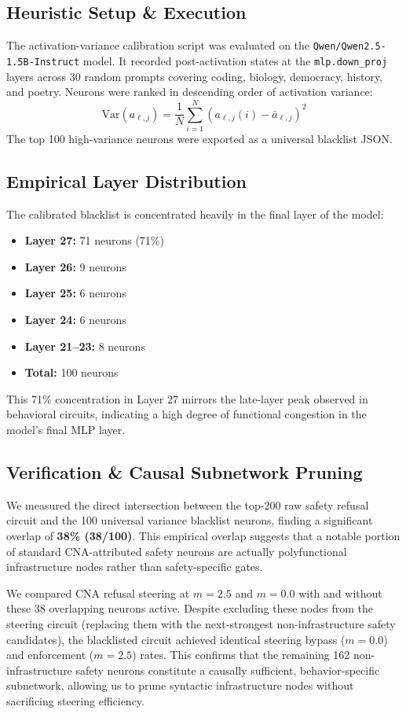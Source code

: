 \documentclass[11pt]{article}
\begin{document}
\subsection{Heuristic Setup \& Execution}
The activation-variance calibration script was evaluated on the \texttt{Qwen/Qwen2.5-1.5B-Instruct} model. It recorded post-activation states at the \texttt{mlp.down\_proj} layers across 30 random prompts covering coding, biology, democracy, history, and poetry. Neurons were ranked in descending order of activation variance:
\begin{equation}
\text{Var}(a_{\ell,j}) = \frac{1}{N}\sum_{i=1}^N (a_{\ell,j}(i) - \bar{a}_{\ell,j})^2
\end{equation}
The top 100 high-variance neurons were exported as a universal blacklist JSON.

\subsection{Empirical Layer Distribution}
The calibrated blacklist is concentrated heavily in the final layer of the model:
\begin{itemize}
    \item \textbf{Layer 27:} 71 neurons (71\%)
    \item \textbf{Layer 26:} 9 neurons
    \item \textbf{Layer 25:} 6 neurons
    \item \textbf{Layer 24:} 6 neurons
    \item \textbf{Layer 21--23:} 8 neurons
    \item \textbf{Total:} 100 neurons
\end{itemize}
This 71\% concentration in Layer 27 mirrors the late-layer peak observed in behavioral circuits, indicating a high degree of functional congestion in the model's final MLP layer.

\subsection{Verification \& Causal Subnetwork Pruning}
We measured the direct intersection between the top-200 raw safety refusal circuit and the 100 universal variance blacklist neurons, finding a significant overlap of \textbf{38\% (38/100)}. This empirical overlap suggests that a notable portion of standard CNA-attributed safety neurons are actually polyfunctional infrastructure nodes rather than safety-specific gates. 

We compared CNA refusal steering at $m=2.5$ and $m=0.0$ with and without these 38 overlapping neurons active. Despite excluding these nodes from the steering circuit (replacing them with the next-strongest non-infrastructure safety candidates), the blacklisted circuit achieved identical steering bypass ($m=0.0$) and enforcement ($m=2.5$) rates. This confirms that the remaining 162 non-infrastructure safety neurons constitute a causally sufficient, behavior-specific subnetwork, allowing us to prune syntactic infrastructure nodes without sacrificing steering efficiency.
\end{document}
